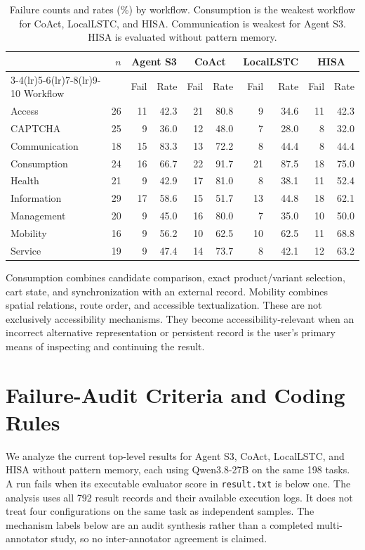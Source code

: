 \documentclass[11pt]{article}
\begin{document}
\begin{table}[t]
\centering
\small
\begin{tabular}{lrrrrrrrrr}
\toprule
& $n$ & \multicolumn{2}{c}{Agent S3} & \multicolumn{2}{c}{CoAct} & \multicolumn{2}{c}{LocalLSTC} & \multicolumn{2}{c}{HISA} \\
\cmidrule(lr){3-4}\cmidrule(lr){5-6}\cmidrule(lr){7-8}\cmidrule(lr){9-10}
Workflow & & Fail & Rate & Fail & Rate & Fail & Rate & Fail & Rate \\
\midrule
Access & 26 & 11 & 42.3 & 21 & 80.8 & 9 & 34.6 & 11 & 42.3 \\
CAPTCHA & 25 & 9 & 36.0 & 12 & 48.0 & 7 & 28.0 & 8 & 32.0 \\
Communication & 18 & 15 & 83.3 & 13 & 72.2 & 8 & 44.4 & 8 & 44.4 \\
Consumption & 24 & 16 & 66.7 & 22 & 91.7 & 21 & 87.5 & 18 & 75.0 \\
Health & 21 & 9 & 42.9 & 17 & 81.0 & 8 & 38.1 & 11 & 52.4 \\
Information & 29 & 17 & 58.6 & 15 & 51.7 & 13 & 44.8 & 18 & 62.1 \\
Management & 20 & 9 & 45.0 & 16 & 80.0 & 7 & 35.0 & 10 & 50.0 \\
Mobility & 16 & 9 & 56.2 & 10 & 62.5 & 10 & 62.5 & 11 & 68.8 \\
Service & 19 & 9 & 47.4 & 14 & 73.7 & 8 & 42.1 & 12 & 63.2 \\
\bottomrule
\end{tabular}
\caption{Failure counts and rates (\%) by workflow. Consumption is the weakest workflow for CoAct, LocalLSTC, and HISA. Communication is weakest for Agent S3. HISA is evaluated without pattern memory.}
\label{tab:workflow-failure-rates}
\end{table}

Consumption combines candidate comparison, exact product/variant selection, cart state, and synchronization with an external record. Mobility combines spatial relations, route order, and accessible textualization. These are not exclusively accessibility mechanisms. They become accessibility-relevant when an incorrect alternative representation or persistent record is the user's primary means of inspecting and continuing the result.

\section{Failure-Audit Criteria and Coding Rules}
\label{app:failure}


We analyze the current top-level results for Agent S3, CoAct, LocalLSTC, and HISA without pattern memory, each using Qwen3.8-27B on the same 198 tasks. A run fails when its executable evaluator score in \texttt{result.txt} is below one. The analysis uses all 792 result records and their available execution logs. It does not treat four configurations on the same task as independent samples. The mechanism labels below are an audit synthesis rather than a completed multi-annotator study, so no inter-annotator agreement is claimed.
\end{document}
